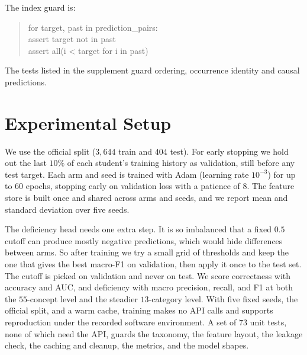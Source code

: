 \documentclass[11pt]{article}
\begin{document}
The index guard is:
\begin{quote}\small\ttfamily
for target, past in prediction\_pairs:\\
\hspace*{1em}assert target not in past\\
\hspace*{1em}assert all(i < target for i in past)
\end{quote}
The tests listed in the supplement guard ordering, occurrence identity and causal predictions.


\section{Experimental Setup}
We use the official split ($3{,}644$ train and $404$ test). For early stopping we hold
out the last $10\%$ of each student's training history as validation, still before any
test target. Each arm and seed is trained with Adam (learning rate $10^{-3}$) for up to
$60$ epochs, stopping early on validation loss with a patience of $8$. The feature
store is built once and shared across arms and seeds, and we report mean and standard
deviation over five seeds.

The deficiency head needs one extra step. It is so imbalanced that a fixed $0.5$ cutoff
can produce mostly negative predictions, which would hide differences between arms. So after training we try a small grid of thresholds and keep the one that
gives the best macro-F1 on validation, then apply it once to the test set. The cutoff
is picked on validation and never on test. We score correctness with accuracy and AUC,
and deficiency with macro precision, recall, and F1 at both the $55$-concept level and
the steadier $13$-category level. With five fixed seeds, the official split, and a warm
cache, training makes no API calls and supports reproduction under the recorded software environment. A set of
$73$ unit tests, none of which need the API, guards the taxonomy, the feature layout,
the leakage check, the caching and cleanup, the metrics, and the model shapes.
\end{document}
